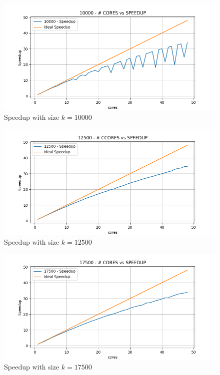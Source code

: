 \documentclass[12pt, titlepage]{report}
\begin{document}
\begin{figure}[H]
	\centering
	\includegraphics[width=\textwidth]{Assignment-1/MPI_strong-static-10000-10-THIN10000_speedUp.png}
	\caption{Speedup with size $k=10000$}
\end{figure}
\begin{figure}[H]
	\centering
	\includegraphics[width=\textwidth]{Assignment-1/MPI_strong-static-12500-10-THIN12500_speedUp.png}
	\caption{Speedup with size $k=12500$}
\end{figure}
\begin{figure}[H]
	\centering
	\includegraphics[width=\textwidth]{Assignment-1/MPI_strong-static-17500-10-THIN17500_speedUp.png}
	\caption{Speedup with size $k=17500$}
\end{figure}
\end{document}
